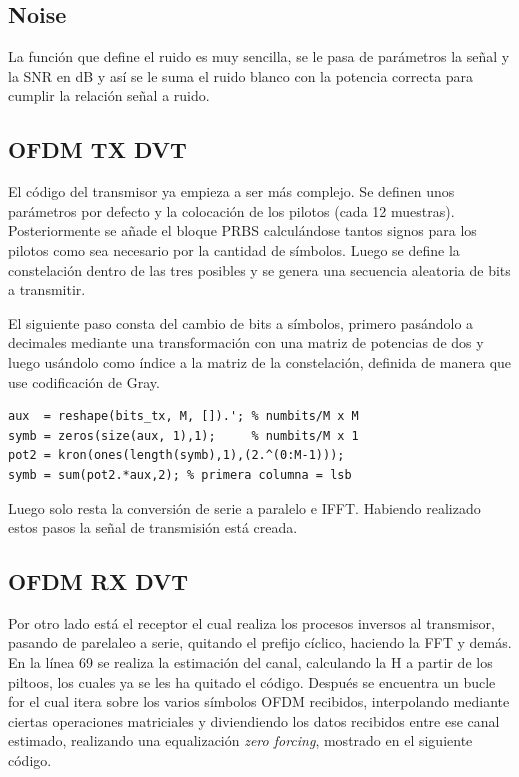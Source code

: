 \documentclass[11pt]{scrartcl} %
\begin{document}
\begin{preview}
\subsection{Noise}

La función que define el ruido es muy sencilla, se le pasa de parámetros la señal y la SNR en dB y así se le suma el ruido blanco con la potencia correcta para cumplir la relación señal a ruido.

\subsection{OFDM TX DVT}

El código del transmisor ya empieza a ser más complejo. Se definen unos parámetros por defecto y la colocación de los pilotos (cada 12 muestras). Posteriormente se añade el bloque PRBS calculándose tantos signos para los pilotos como sea necesario por la cantidad de símbolos. Luego se define la constelación dentro de las tres posibles y se genera una secuencia aleatoria de bits a transmitir. 

El siguiente paso consta del cambio de bits a símbolos, primero pasándolo a decimales mediante una transformación con una matriz de potencias de dos y luego usándolo como índice a la matriz de la constelación, definida de manera que use codificación de Gray. 

\begin{verbatim}
aux  = reshape(bits_tx, M, []).'; % numbits/M x M
symb = zeros(size(aux, 1),1);     % numbits/M x 1
pot2 = kron(ones(length(symb),1),(2.^(0:M-1)));
symb = sum(pot2.*aux,2); % primera columna = lsb 
\end{verbatim}

Luego solo resta la conversión de serie a paralelo e IFFT. Habiendo realizado estos pasos la señal de transmisión está creada.

\subsection{OFDM RX DVT}

Por otro lado está el receptor el cual realiza los procesos inversos al transmisor, pasando de parelaleo a serie, quitando el prefijo cíclico, haciendo la FFT y demás. En la línea 69 se realiza la estimación del canal, calculando la H a partir de los piltoos, los cuales ya se les ha quitado el código. Después se encuentra un bucle for el cual itera sobre los varios símbolos OFDM recibidos, interpolando mediante ciertas operaciones matriciales y diviendiendo los datos recibidos entre ese canal estimado, realizando una equalización \emph{zero forcing}, mostrado en el siguiente código.


\end{preview}
\end{document}
